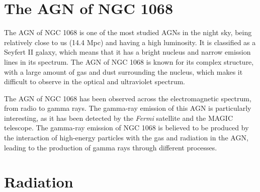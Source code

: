\section{The AGN of NGC 1068}

The AGN of NGC 1068 is one of the most studied AGNs in the night sky, being relatively close to us (14.4 Mpc) and having a high luminosity. It is classified as a Seyfert II galaxy, which means that it has a bright nucleus and narrow emission lines in its spectrum. The AGN of NGC 1068 is known for its complex structure, with a large amount of gas and dust surrounding the nucleus, which makes it difficult to observe in the optical and ultraviolet spectrum.

The AGN of NGC 1068 has been observed across the electromagnetic spectrum, from radio to gamma rays. The gamma-ray emission of this AGN is particularly interesting, as it has been detected by the \textit{Fermi} satellite and the MAGIC telescope. The gamma-ray emission of NGC 1068 is believed to be produced by the interaction of high-energy particles with the gas and radiation in the AGN, leading to the production of gamma rays through different processes.

\section{Radiation}





